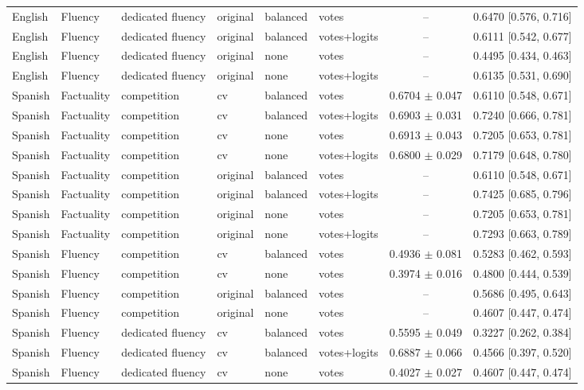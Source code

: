 \begin{tabular}{llllllcc}
English & Fluency & dedicated fluency & original & balanced & votes & -- & 0.6470 [0.576, 0.716] \\
English & Fluency & dedicated fluency & original & balanced & votes+logits & -- & 0.6111 [0.542, 0.677] \\
English & Fluency & dedicated fluency & original & none & votes & -- & 0.4495 [0.434, 0.463] \\
English & Fluency & dedicated fluency & original & none & votes+logits & -- & 0.6135 [0.531, 0.690] \\
\hline
Spanish & Factuality & competition & cv & balanced & votes & 0.6704 $\pm$ 0.047 & 0.6110 [0.548, 0.671] \\
Spanish & Factuality & competition & cv & balanced & votes+logits & 0.6903 $\pm$ 0.031 & 0.7240 [0.666, 0.781] \\
Spanish & Factuality & competition & cv & none & votes & 0.6913 $\pm$ 0.043 & 0.7205 [0.653, 0.781] \\
Spanish & Factuality & competition & cv & none & votes+logits & 0.6800 $\pm$ 0.029 & 0.7179 [0.648, 0.780] \\
Spanish & Factuality & competition & original & balanced & votes & -- & 0.6110 [0.548, 0.671] \\
Spanish & Factuality & competition & original & balanced & votes+logits & -- & 0.7425 [0.685, 0.796] \\
Spanish & Factuality & competition & original & none & votes & -- & 0.7205 [0.653, 0.781] \\
Spanish & Factuality & competition & original & none & votes+logits & -- & 0.7293 [0.663, 0.789] \\
\hline
Spanish & Fluency & competition & cv & balanced & votes & 0.4936 $\pm$ 0.081 & 0.5283 [0.462, 0.593] \\
Spanish & Fluency & competition & cv & none & votes & 0.3974 $\pm$ 0.016 & 0.4800 [0.444, 0.539] \\
Spanish & Fluency & competition & original & balanced & votes & -- & 0.5686 [0.495, 0.643] \\
Spanish & Fluency & competition & original & none & votes & -- & 0.4607 [0.447, 0.474] \\
Spanish & Fluency & dedicated fluency & cv & balanced & votes & 0.5595 $\pm$ 0.049 & 0.3227 [0.262, 0.384] \\
Spanish & Fluency & dedicated fluency & cv & balanced & votes+logits & 0.6887 $\pm$ 0.066 & 0.4566 [0.397, 0.520] \\
Spanish & Fluency & dedicated fluency & cv & none & votes & 0.4027 $\pm$ 0.027 & 0.4607 [0.447, 0.474] \\

\end{tabular}
